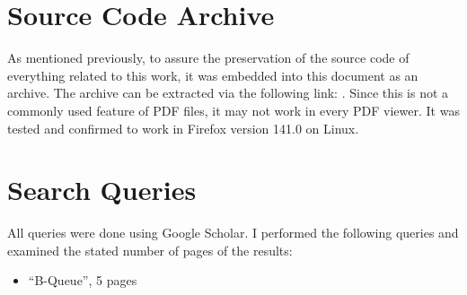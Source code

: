 \appendix

\section{Source Code Archive}
\label{app:source-code-archive}
As mentioned previously, to assure the preservation of the source code of everything related to this work, it
was embedded into this document as an archive.
The archive can be extracted via the following link: .
Since this is not a commonly used feature of PDF files, it may not work in every PDF viewer.
It was tested and confirmed to work in Firefox version 141.0 on Linux.

\section{Search Queries}
\label{app:repro-search-queries}
All queries were done using Google Scholar.
I performed the following queries and examined the stated number of pages of the results:
\begin{itemize}
    \item ``B-Queue'', 5 pages
\end{itemize}

